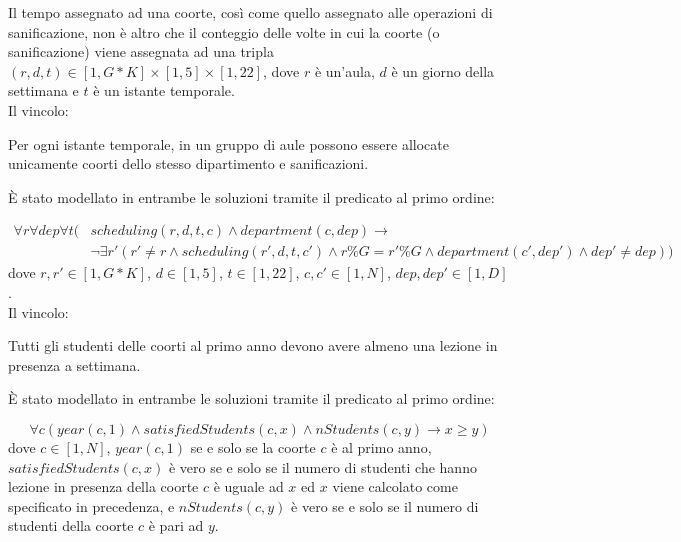 \documentclass[12pt, italian, openany]{book}
\begin{document}
Il tempo assegnato ad una coorte, così come quello assegnato alle operazioni di sanificazione, non è altro che il conteggio delle volte in cui la coorte (o sanificazione) viene assegnata ad una tripla $(r, d, t) \in \left[1, G*K \right] \times \left[1, 5 \right] \times \left[1, 22\right]$, dove $r$ è un'aula, $d$ è un giorno della settimana e $t$ è un istante temporale.\\
Il vincolo:
\begin{tcolorbox}[title=\textbf{Vincolo aule-dipartimenti}]
Per ogni istante temporale, in un gruppo di aule possono essere allocate unicamente coorti dello stesso dipartimento e sanificazioni.
\end{tcolorbox}
È stato modellato in entrambe le soluzioni tramite il predicato al primo ordine:

\begin{equation}
\begin{split}
\forall r  \forall dep  \forall t (&scheduling(r,d,t,c) \wedge department(c,dep)  \rightarrow \\
                                          &\neg \exists r' (r' \neq r \wedge scheduling(r',d,t,c') \wedge r \% G = r' \% G \wedge department(c',dep')  \wedge dep' \neq dep))
\end{split}
\end{equation}
dove $r,r' \in \left[1, G*K\right]$, $d \in \left[1, 5 \right]$, $t \in \left[1, 22 \right]$, $c,c' \in \left[1, N \right]$, $dep, dep' \in \left[1, D \right]$.\\
Il vincolo:
\begin{tcolorbox}[title=\textbf{Vincolo coorti al primo anno - studenti}]
Tutti gli studenti delle coorti al primo anno devono avere almeno una lezione in presenza a settimana.
\end{tcolorbox}
È stato modellato in entrambe le soluzioni tramite il predicato al primo ordine:

\begin{equation}
\forall c (year(c,1) \wedge satisfiedStudents(c, x) \wedge nStudents(c, y) \rightarrow x \geq y)
\end{equation}
dove $c \in \left[1, N\right]$, $year(c,1)$ se e solo se la coorte $c$ è al primo anno, $satisfiedStudents(c,x)$ è vero se e solo se il numero di studenti che hanno lezione in presenza della coorte $c$ è uguale ad $x$ ed $x$ viene calcolato come specificato in precedenza, e $nStudents(c,y)$ è vero se e solo se il numero di studenti della coorte $c$ è pari ad $y$.\\
\end{document}
